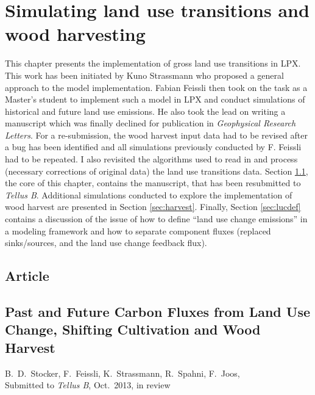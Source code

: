 \chapter{Simulating land use transitions and wood harvesting}
\label{sec:lutrans}

This chapter presents the implementation of gross land use transitions in LPX. This work has been initiated by Kuno Strassmann who proposed a general approach to the model implementation. Fabian Feissli then took on the task as a Master's student to implement such a model in LPX and conduct simulations of historical and future land use emissions. He also took the lead on writing a manuscript which was finally declined for publication in {\it Geophysical Research Letters}. For a re-submission, the wood harvest input data had to be revised after a bug has been identified and all simulations previously conducted by F. Feissli had to be repeated. I also revisited the algorithms used to read in and process (necessary corrections of original data) the land use transitions data. Section \ref{sec:article.lutrans}, the core of this chapter, contains the manuscript, that has been resubmitted to {\it Tellus B}. Additional simulations conducted to explore the implementation of wood harvest are presented in Section \ref{sec:harvest}. Finally, Section \ref{sec:lucdef} contains a discussion of the issue of how to define ``land use change emissions'' in a modeling framework and how to separate component fluxes (replaced sinks/sources, and the land use change feedback flux).

\section{Article}
\label{sec:article.lutrans}
\section*{Past and Future Carbon Fluxes from Land Use Change, Shifting Cultivation and Wood Harvest }
\label{sec:lutrans.article}
{B.~D.~Stocker\footnotemark[1]\footnotemark[2],
F.~Feissli\footnotemark[1]\footnotemark[2],
K.~Strassmann\footnotemark[1]\footnotemark[2],
R.~Spahni\footnotemark[1]\footnotemark[2],
F.~Joos\footnotemark[1]\footnotemark[2],
}
\bigskip\\
\noindent
{Submitted to \emph{Tellus B}, Oct.~2013, in review}


\clearpage
%
